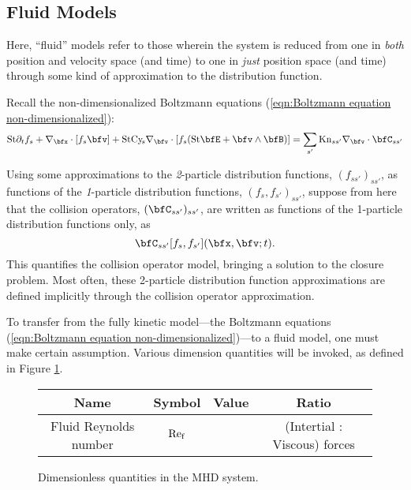 \subsection{Fluid Models}\label{cha:fluid models}
    \line

    \begin{definition}\label{def:fluid model}
        Here, ``fluid'' models refer to those wherein the system is reduced from one in \emph{both} position and velocity space (and time) to one in \emph{just} position space (and time) through some kind of approximation to the distribution function.
    \end{definition}

    \line
    
    Recall the non-dimensionalized Boltzmann equations (\ref{eqn:Boltzmann equation non-dimensionalized}):
    \begin{equation*}
        \rmSt\partial_{t}f_{s} + \nabla_{\bfx}\cdot[f_{s}\bfv] + \rmSt\rmCy\!_{s}\nabla_{\bfv}\cdot[f_{s}(\rmSt\bfE + \bfv\wedge\bfB)]  =   \sum_{s'}\rmKn_{ss'}\nabla_{\bfv}\cdot\bfC_{ss'}
    \end{equation*}
    
    Using some approximations to the \emph{2}-particle distribution functions, $(f_{ss'})_{ss'}$, as functions of the \emph{1}-particle distribution functions, $(f_{s}, f_{s'})_{ss'}$, suppose from here that the collision operators, $(\bfC_{ss'})_{ss'}$, are written as functions of the 1-particle distribution functions only, as
    \begin{equation}
        \bfC_{ss'}[f_{s}, f_{s'}](\bfx, \bfv; t).
    \end{equation}
    This quantifies the collision operator model, bringing a solution to the closure problem. Most often, these 2-particle distribution function approximations are defined implicitly through the collision operator approximation.

    To transfer from the fully kinetic model---the Boltzmann equations (\ref{eqn:Boltzmann equation non-dimensionalized})---to a fluid model, one must make certain assumption. Various dimension quantities will be invoked, as defined in Figure \ref{fig:fluid dimensionless quantities}.

    \begin{figure}
        \centering
        \begin{tabular}{ c c c c }
            Name  &  Symbol  &  Value  &  Ratio  \\
            \hline\hline
            Fluid Reynolds number  &  $\mathrm{Re}_{\mathrm{f}}$  &  \BA{$...$}  &  (Intertial : Viscous) forces  \\
        \end{tabular}
        \caption{Dimensionless quantities in the MHD system.}
        \label{fig:fluid dimensionless quantities}
    \end{figure} 


    
    
    
    
    